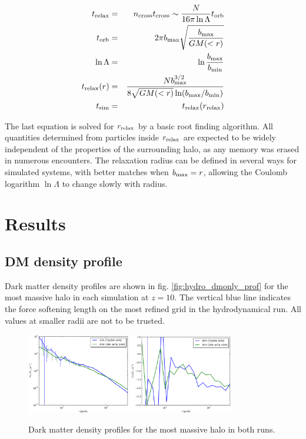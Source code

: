 \documentclass[useAMS,usenatbib]{mn2e}
\begin{document}
\begin{eqnarray}
  t_{\rm relax}&=&n_{\rm cross}t_{\rm cross}\sim\frac{N}{16\pi\ln\Lambda}t_{\rm orb}\\
  t_{\rm orb}&=&2\pi b_{\rm max}\sqrt{\frac{b_{\rm max}}{GM(<r)}}\\
  \ln\Lambda&=&\ln\frac{b_{\rm max}}{b_{\rm min}}\\
  t_{\rm relax}(r)&=&\frac{N b_{\rm max}^{3/2}}{8\sqrt{GM(<r)}\ln(b_{\rm max}/b_{\rm min})}\\
  t_{\rm sim}&=&t_{\rm relax}(r_{\rm relax})
\end{eqnarray}

The last equation is solved for $r_{\rm relax}$ by a basic root
finding algorithm. All quantities determined from particles inside
$r_{\rm relax}$ are expected to be widely independent of the
properties of the surrounding halo, as any memory was erased in
numerous encounters. The relaxation radius can be defined in several
ways for simulated systems, with better matches when $b_{\rm max}=r$,
allowing the Coulomb logarithm $\ln\Lambda$ to change slowly with
radius.

\section{Results}
\label{sec:res}

\subsection{DM density profile}
Dark matter density profiles are shown in
fig. \ref{fig:hydro_dmonly_prof} for the most massive halo in each
simulation at $z=10$. The vertical blue line indicates the force
softening length on the most refined grid in the hydrodynamical
run. All values at smaller radii are not to be trusted.

\begin{figure}
  \begin{center}
    \includegraphics[width=0.4\textwidth]{fig/hydro_dmonly_prof.eps}
    \includegraphics[width=0.4\textwidth]{fig/dlnrhodm.eps}
  \end{center}
  \caption{\label{fig:dm_prof}Dark matter density profiles for the
    most massive halo in both runs.}
\end{figure}
\end{document}
